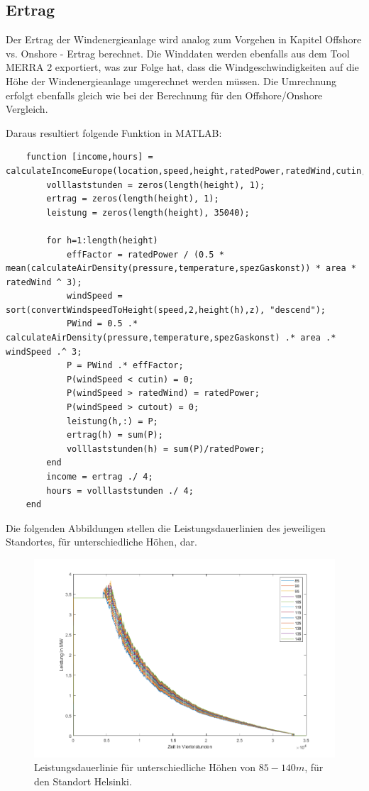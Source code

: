 \documentclass[a4paper,12pt]{article}
\begin{document}
	\subsection{Ertrag}
	Der Ertrag der Windenergieanlage wird analog zum Vorgehen in Kapitel Offshore vs. Onshore - Ertrag berechnet.\newline
	Die Winddaten werden ebenfalls aus dem Tool MERRA 2 exportiert, was zur Folge hat, dass die Windgeschwindigkeiten auf die Höhe der Windenergieanlage umgerechnet werden müssen. Die Umrechnung erfolgt ebenfalls gleich wie bei der Berechnung für den Offshore/Onshore Vergleich.\\ \par
	\noindent Daraus resultiert folgende Funktion in MATLAB:
	\begin{lstlisting}
	function [income,hours] = calculateIncomeEurope(location,speed,height,ratedPower,ratedWind,cutin,cutout,pressure,temperature,area,z,spezGaskonst)
		volllaststunden = zeros(length(height), 1);
		ertrag = zeros(length(height), 1);
		leistung = zeros(length(height), 35040);
	
		for h=1:length(height)
			effFactor = ratedPower / (0.5 * mean(calculateAirDensity(pressure,temperature,spezGaskonst)) * area * ratedWind ^ 3);
			windSpeed = sort(convertWindspeedToHeight(speed,2,height(h),z), "descend");
			PWind = 0.5 .* calculateAirDensity(pressure,temperature,spezGaskonst) .* area .* windSpeed .^ 3;
			P = PWind .* effFactor;
			P(windSpeed < cutin) = 0;
			P(windSpeed > ratedWind) = ratedPower;
			P(windSpeed > cutout) = 0;
			leistung(h,:) = P;
			ertrag(h) = sum(P);
			volllaststunden(h) = sum(P)/ratedPower;
		end
		income = ertrag ./ 4;
		hours = volllaststunden ./ 4;
	end
	\end{lstlisting}
	Die folgenden Abbildungen stellen die Leistungsdauerlinien des jeweiligen Standortes, für unterschiedliche Höhen, dar.
	\begin{figure}[H]
		\centering
		\includegraphics[width=12cm]{img/results/LeistungsdauerlinieHelsinki}
		\caption{Leistungsdauerlinie für unterschiedliche Höhen von $85 - 140m$, für den Standort Helsinki.}
	\end{figure}
\end{document}
